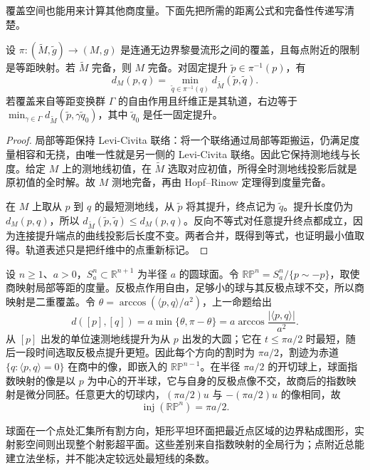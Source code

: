 覆盖空间也能用来计算其他商度量。下面先把所需的距离公式和完备性传递写清楚。

\begin{proposition}\label{g3:prop:riemannian-covering-distance}
	设 \(\pi:(\widetilde M,\widetilde g)\to(M,g)\) 是连通无边界黎曼流形之间的覆盖，且每点附近的限制是等距映射。若 \(\widetilde M\) 完备，则 \(M\) 完备。对固定提升 \(\widetilde p\in\pi^{-1}(p)\)，有
	\[
		d_M(p,q)=\min_{\widetilde q\in\pi^{-1}(q)}
		d_{\widetilde M}(\widetilde p,\widetilde q).
	\]
	若覆盖来自等距变换群 \(\Gamma\) 的自由作用且纤维正是其轨道，右边等于 \(\min_{\gamma\in\Gamma}d_{\widetilde M}(\widetilde p,\gamma\widetilde q_0)\)，其中 \(\widetilde q_0\) 是任一固定提升。
\end{proposition}
\begin{proof}
	局部等距保持 Levi-Civita 联络：将一个联络通过局部等距搬运，仍满足度量相容和无挠，由唯一性就是另一侧的 Levi-Civita 联络。因此它保持测地线与长度。给定 \(M\) 上的测地线初值，在 \(\widetilde M\) 选取对应初值，所得全时测地线投影后就是原初值的全时解。故 \(M\) 测地完备，再由 Hopf--Rinow 定理得到度量完备。

	在 \(M\) 上取从 \(p\) 到 \(q\) 的最短测地线，从 \(\widetilde p\) 将其提升，终点记为 \(\widetilde q\)。提升长度仍为 \(d_M(p,q)\)，所以 \(d_{\widetilde M}(\widetilde p,\widetilde q)\le d_M(p,q)\)。反向不等式对任意提升终点都成立，因为连接提升端点的曲线投影后长度不变。两者合并，既得到等式，也证明最小值取得。轨道表述只是把纤维中的点重新标记。
\end{proof}

\begin{example}\label{g3:exm:projective-cut-locus}
	设 \(n\ge1\)、\(a>0\)，\(S_a^n\subset\mathbb R^{n+1}\) 为半径 \(a\) 的圆球面。令 \(\mathbb{RP}^n=S_a^n/\{p\sim-p\}\)，取使商映射局部等距的度量。反极点作用自由，足够小的球与其反极点球不交，所以商映射是二重覆盖。令 \(\theta=\arccos(\langle p,q\rangle/a^2)\)，上一命题给出
	\[
		d([p],[q])=a\min\{\theta,\pi-\theta\}
		=a\arccos\frac{|\langle p,q\rangle|}{a^2}.
	\]
	从 \([p]\) 出发的单位速测地线提升为从 \(p\) 出发的大圆；它在 \(t\le\pi a/2\) 时最短，随后一段时间选取反极点提升更短。因此每个方向的割时为 \(\pi a/2\)，割迹为赤道 \(\{q:\langle p,q\rangle=0\}\) 在商中的像，即嵌入的 \(\mathbb{RP}^{n-1}\)。在半径 \(\pi a/2\) 的开切球上，球面指数映射的像是以 \(p\) 为中心的开半球，它与自身的反极点像不交，故商后的指数映射是微分同胚。任意更大的切球内，\((\pi a/2)u\) 与 \(-(\pi a/2)u\) 的像相同，故
	\[
		\operatorname{inj}(\mathbb{RP}^n)=\pi a/2.
	\]
\end{example}

球面在一个点处汇集所有割方向，矩形平坦环面把最近点区域的边界粘成图形，实射影空间则出现整个射影超平面。这些差别来自指数映射的全局行为；点附近总能建立法坐标，并不能决定较远处最短线的条数。
